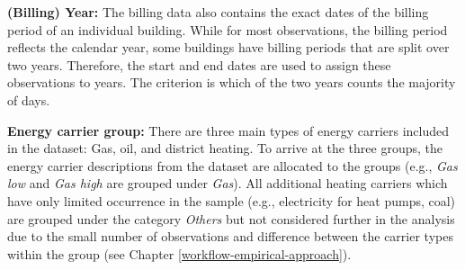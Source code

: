 \documentclass[12pt,twoside]{reedthesis}
\begin{document}
\textbf{(Billing) Year:} The billing data also contains the exact dates of the billing period of an individual building. While for most observations, the billing period reflects the calendar year, some buildings have billing periods that are split over two years. Therefore, the start and end dates are used to assign these observations to years. The criterion is which of the two years counts the majority of days.

\textbf{Energy carrier group:} There are three main types of energy carriers included in the dataset: Gas, oil, and district heating. To arrive at the three groups, the energy carrier descriptions from the dataset are allocated to the groups (e.g., \emph{Gas low} and \emph{Gas high} are grouped under \emph{Gas}). All additional heating carriers which have only limited occurrence in the sample (e.g., electricity for heat pumps, coal) are grouped under the category \emph{Others} but not considered further in the analysis due to the small number of observations and difference between the carrier types within the group (see Chapter \ref{workflow-empirical-approach}).
\end{document}
